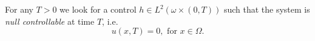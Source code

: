 \documentclass[11pt,oneside,a4papper]{osajnl}
\begin{document}

For any $T>0$ we look for a control $h \in L^2(\omega \times (0,T))$ such that the system is \emph{null controllable} at time $T$, i.e. 
$$
u(x,T) = 0, \text{ for } x \in \Omega.
$$




\end{document}
